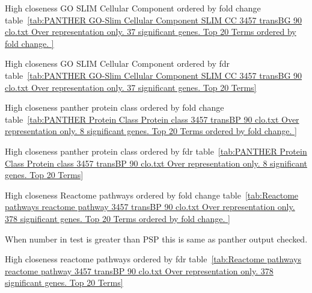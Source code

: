 High closeness GO SLIM Cellular Component ordered by fold change table~\ref{tab:PANTHER GO-Slim Cellular Component SLIM CC 3457 transBG 90 clo.txt Over representation only. 37 significant genes. Top 20 Terms ordered by fold change. }


High closeness GO SLIM Cellular Component ordered by fdr table~\ref{tab:PANTHER GO-Slim Cellular Component SLIM CC 3457 transBG 90 clo.txt Over representation only. 37 significant genes. Top 20 Terms}



High closeness panther protein class ordered by fold change table~\ref{tab:PANTHER Protein Class Protein class 3457 transBP 90 clo.txt Over representation only. 8 significant genes. Top 20 Terms ordered by fold change. }



High closeness panther protein class ordered by fdr table~\ref{tab:PANTHER Protein Class Protein class 3457 transBP 90 clo.txt Over representation only. 8 significant genes. Top 20 Terms}




High closeness Reactome pathways ordered by fold change table~\ref{tab:Reactome pathways reactome pathway 3457 transBP 90 clo.txt Over representation only. 378 significant genes. Top 20 Terms ordered by fold change. }


When number in test is greater than PSP this is same as panther output checked. 

High closeness reactome pathways ordered by fdr table~\ref{tab:Reactome pathways reactome pathway 3457 transBP 90 clo.txt Over representation only. 378 significant genes. Top 20 Terms}





